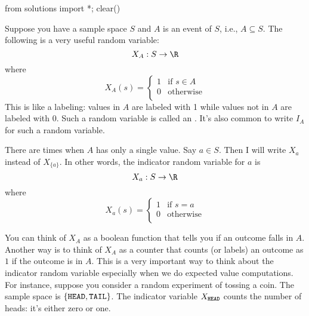 \begin{python0}
from solutions import *; clear()
\end{python0}

Suppose you have a sample space $S$ and $A$ is an event of $S$,
i.e., $A \subseteq S$.
The following is a very useful random variable:
\[
X_A : S \rightarrow \R
\]
where
\[
X_A(s) =
\begin{cases}
  1 & \text{if $s \in A$} \\
  0 & \text{otherwise} \\
\end{cases}
\]
This is like a labeling: values in $A$ are labeled with 1
while values not in $A$ are labeled with 0.
Such a random variable is called an .
It's also common to write $I_A$ for such a random variable.

There are times when $A$ has only a single value.
Say $a \in S$.
Then I will write $X_a$ instead of $X_{\{a\}}$.
In other words, 
the indicator random variable for $a$ is
\[
X_a : S \rightarrow \R
\]
where
\[
X_a(s) =
\begin{cases}
  1 & \text{if $s = a$} \\
  0 & \text{otherwise} \\
\end{cases}
\]

You can think of $X_A$ as a boolean function that tells you if
an outcome falls in $A$.
Another way is to think of $X_A$ as a counter that counts (or labels)
an outcome as $1$ if the outcome is in $A$.
This is a very important way to think about the
indicator random variable especially when we do
expected value computations.
For instance, suppose you consider a random experiment
of tossing a coin.
The sample space is $\{ \texttt{HEAD}, \texttt{TAIL} \}$.
The indicator variable $X_{\texttt{HEAD}}$ counts the number of heads:
it's either zero or one.


